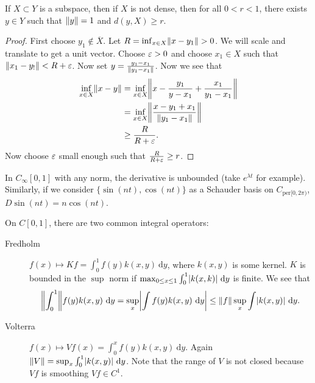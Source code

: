 \documentclass[10pt, twoside]{article}
\renewcommand{\d}{\ \mathrm{d}}
\begin{document}
    \begin{lem}[Riesz] If $X \subset Y$ is a subspace, then if $X$ is not
        dense, then for all $0 < r < 1$, there exists $y \in Y$ such that
        $\lVert y\rVert = 1$ and $d(y,X) \geq r$.  \begin{proof} First choose $y_1
            \not\in \overline{X}$. Let $R = \inf_{x \in X} \lVert x-y_1\rVert > 0$.
            We will scale and translate to get a unit vector. Choose $\varepsilon > 0$
            and choose $x_1 \in X$ such that $\lVert x_1-y_!\rVert < R+\varepsilon$. Now set
            $y = \frac{y_1-x_1}{\lVert y_1-x_1\rVert}$. Now we see that
            \begin{align*} \inf_{x \in X} \norm{x-y} &= \inf_{x \in X} \norm*{x
                - \frac{y_1}{y-x_1} + \frac{x_1}{y_1-x_1}} \\ &= \inf_{x \in X}
                \norm*{\frac{x-y_1+x_1}{\norm{y_1-x_1}}} \\ &\geq
            \frac{R}{R+\ep}.  \end{align*} Now choose $\varepsilon$ small enough such
        that $\frac{R}{R+\varepsilon} \geq r$.  \end{proof} \end{lem}
   
    \begin{exm} In $C_{\infty}[0,1]$ with any norm, the derivative is unbounded
        (take $e^{\lambda t}$ for example). Similarly, if we consider
        $\{\sin(nt), \cos(nt)\}$ as a Schauder basis on
        $C_{\mathrm{per}[0,2\pi)}$, $D \sin(nt) = n\cos(nt)$.  \end{exm}

    \begin{exm} On $C[0,1]$, there are two common integral operators:
        \begin{description} \item[Fredholm] $f(x) \mapsto Kf = \int_0^1
            f(y)k(x,y)\d y$, where $k(x,y)$ is some kernel. $K$ is bounded in
            the $\sup$ norm if $\max_{0 \leq x \leq 1} \int_0^1 \abs{k(x,k)}\d
            y$ is finite. We see that\[ \norm*{\int_0^1} f(y)k(x,y)\d y =
            \sup_x \abs*{\int f(y) k(x,y) \d y} \leq \norm{f} \sup_x \int
        \abs{k(x,y)} \d y. \] \item[Volterra] $f(x) \mapsto Vf(x) = \int_0^x
f(y) k(x,y) \d y$. Again $\norm{V} = \sup_x \int_0^1 \abs{k(x,y)} \d y$. Note
that the range of $V$ is not closed because $Vf$ is smoothing $Vf \in C^1$.
\end{description} \end{exm}
\end{document}
